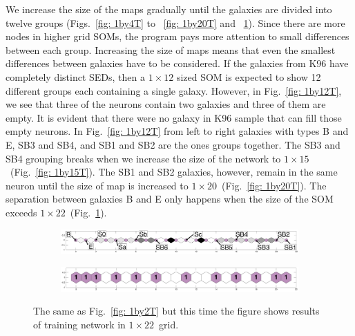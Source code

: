             We increase the size of the maps gradually until the galaxies are divided into twelve groups (Figs.~\ref{fig: 1by4T} to ~\ref{fig: 1by20T} and ~\ref{fig: 1by22T}).
            Since there are more nodes in higher grid SOMs, the program%
            pays more attention to small differences between each group.
            Increasing the size of maps means that even the smallest differences between galaxies have to be considered.
            If the galaxies from K96 have completely distinct SEDs, then a $1\times12$ sized SOM is expected to show 12 different groups each containing a single galaxy.
            However, in Fig.~\ref{fig: 1by12T}, we see that three of the neurons contain two galaxies and three of them are empty.
            It is evident that there were no galaxy in K96 sample that can fill those empty neurons.
            In Fig.~\ref{fig: 1by12T} from left to right galaxies with types B and E, SB3 and SB4, and SB1 and SB2 are the ones groups together. 
            The SB3 and SB4 grouping breaks when we increase the size of the network to $1\times15$~(Fig.~\ref{fig: 1by15T}).
            The SB1 and SB2 galaxies, however, remain in the same neuron until the size of map is increased to $1\times20$~(Fig.~\ref{fig: 1by20T}).
            The separation between galaxies B and E only happens when the size of the SOM exceeds $1\times22$~(Fig.~\ref{fig: 1by22T}).
        \begin{figure}
            \begin{subfigure}[b]{\textwidth}
                \centering
                \includegraphics[width=\textwidth]{images0.01/1d/dist_1_by_22.png}
            \end{subfigure}
            \hfill
            \begin{subfigure}[b]{\textwidth}
                \includegraphics[width=\textwidth]{images0.01/1d/hit_t_1_by_22.png}
            \end{subfigure}
            \caption{The same as Fig.~\ref{fig: 1by2T} but this time the figure shows results of training network in $1\times22$~grid.}
            \label{fig: 1by22T}
        \end{figure} %
    
